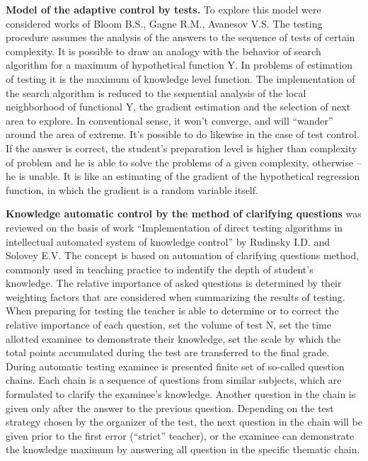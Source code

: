 \textbf{Model of the adaptive control by tests.} To explore this model were considered works of Bloom B.S., Gagne R.M., Avanesov V.S. The testing procedure assumes the analysis of the answers to the sequence of tests of certain complexity. It is possible to draw an analogy with the behavior of search algorithm for a maximum of hypothetical function Y. In problems of estimation of testing it is the maximum of knowledge level function. The implementation of the search algorithm is reduced to the sequential analysis of the local neighborhood of functional Y, the gradient estimation and the selection of next area to explore. In conventional sense, it won’t converge, and will ``wander'' around the area of extreme. It’s possible to do likewise in the case of test control. If the answer is correct, the student’s preparation level is higher than complexity of problem and he is able to solve the problems of a given complexity, otherwise – he is unable. It is like an estimating of the gradient of the hypothetical regression function, in which the gradient is a random variable itself.

\textbf{Knowledge automatic control by the method of clarifying questions} was reviewed on the basis of work ``Implementation of direct testing algorithms in intellectual automated system of knowledge control'' by Rudinsky I.D. and Solovey E.V. The concept is based on automation of clarifying questions method, commonly used in teaching practice to indentify the depth of student’s knowledge. The relative importance of asked questions is determined by their weighting factors that are considered when summarizing the results of testing. When preparing for testing the teacher is able to determine or to correct the relative importance of each question, set the volume of test N, set the time allotted examinee to demonstrate their knowledge, set the scale by which the total points accumulated during the test are transferred to the final grade. During automatic testing examinee is presented finite set of so-called question chains. Each chain is a sequence of questions from similar subjects, which are formulated to clarify the examinee’s knowledge. Another question in the chain is given only after the answer to the previous question. Depending on the test strategy chosen by the organizer of the test, the next question in the chain will be given prior to the first error (``strict'' teacher), or the examinee can demonstrate the knowledge maximum by answering all question in the specific thematic chain.

